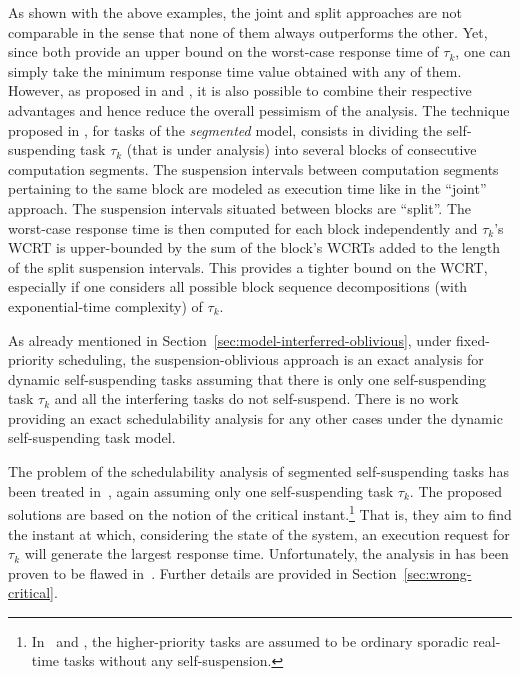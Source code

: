 As shown with the above examples, the joint and split approaches are not comparable in the sense that none 
of them always outperforms the other. Yet, since both provide an upper bound on the worst-case response time of $\tau_k$, one can 
simply take the minimum response time value obtained with any of them. However, as proposed in \cite[Chapter 5.4]{bletsas:thesis} and \cite{Huang:multiseg}, 
it is also possible to combine their respective advantages and hence reduce the overall pessimism of the analysis. 
The technique proposed in \cite{bletsas:thesis}, for tasks of the \emph{segmented} model,
consists in dividing the self-suspending task $\tau_k$ (that is under analysis) into several blocks of consecutive 
computation segments. The suspension intervals between computation segments pertaining to the same block are modeled as execution time 
like in the ``joint'' approach. The suspension intervals situated between blocks are ``split''. The worst-case response time is then computed for each 
block independently and $\tau_k$'s WCRT is upper-bounded by the sum of the block's WCRTs added to the length of the split suspension 
intervals. This provides a tighter bound on the WCRT, especially if one considers all possible block sequence decompositions (with exponential-time complexity) of $\tau_k$. 

\label{sec:existing-exact-special}

As already mentioned in Section~\ref{sec:model-interferred-oblivious}, under fixed-priority scheduling, the suspension-oblivious approach is an exact analysis for dynamic 
self-suspending tasks assuming that there is only one self-suspending task $\tau_k$ and all the interfering tasks do not self-suspend. 
There is no work providing an exact schedulability analysis for any other cases under the dynamic self-suspending task model.

The problem of the schedulability analysis of segmented self-suspending tasks has been treated in~\cite{LR:rtas10,ecrts15nelissen}, 
again assuming only one self-suspending task $\tau_k$. The proposed solutions are based on the notion of the critical instant.\footnote{\label{footnote-critical-instant}In~\cite[Secs. IV-V]{ecrts15nelissen} and
    \cite[Sec. III]{LR:rtas10}, the higher-priority tasks are assumed
    to be ordinary sporadic real-time tasks without any
    self-suspension.}
That is, they aim to find the instant at which, considering the state of the system, an execution request for $\tau_k$ will 
generate the largest response time. Unfortunately, the analysis in \cite{LR:rtas10} has been proven to be flawed in~\cite{ecrts15nelissen}. 
Further details are provided in Section~\ref{sec:wrong-critical}.

